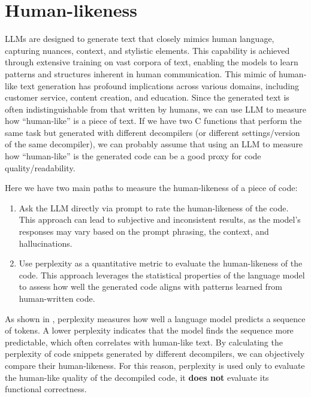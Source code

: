 \section{Human-likeness}\label{sec:human-like}
\acp{LLM} are designed to generate text that closely mimics human language, capturing nuances, context, and stylistic elements.
This capability is achieved through extensive training on vast corpora of text, enabling the models to learn patterns and structures inherent in human communication.
This mimic of human-like text generation has profound implications across various domains, including customer service, content creation, and education.
Since the generated text is often indistinguishable from that written by humans, we can use \ac{LLM} to measure how ``human-like'' is a piece of text.
If we have two C functions that perform the same task but generated with different decompilers (or different settings/version of the same decompiler), 
we can probably assume that using an \ac{LLM} to measure how ``human-like'' is the generated code can be a good proxy for code quality/readability.

Here we have two main paths to measure the human-likeness of a piece of code:
\begin{enumerate}
    \item Ask the \ac{LLM} directly via prompt to rate the human-likeness of the code. This approach can lead to subjective and inconsistent results, 
    as the model's responses may vary based on the prompt phrasing, the context, and hallucinations.
    \item Use perplexity as a quantitative metric to evaluate the human-likeness of the code. This approach leverages the statistical 
    properties of the language model to assess how well the generated code aligns with patterns learned from human-written code.
\end{enumerate}
As shown in , perplexity measures how well a language model predicts a sequence of tokens. A lower perplexity indicates that the model finds the sequence more predictable, 
which often correlates with human-like text. By calculating the perplexity of code snippets generated by different decompilers, we can objectively compare their human-likeness.
For this reason, perplexity is used only to evaluate the human-like quality of the decompiled code, it \textbf{does not} evaluate its functional correctness.

